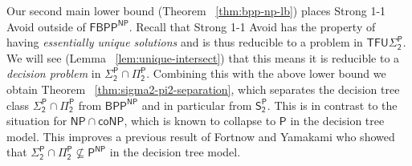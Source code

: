 Our second main lower bound (Theorem ~\ref{thm:bpp-np-lb}) places {\sc Strong 1-1 Avoid} outside of $\mathsf{FBPP^{NP}}$. 
Recall that {\sc Strong 1-1 Avoid} has the property of having \emph{essentially unique solutions} and is thus reducible to a problem in $\mathsf{TFU\Sigma_2^P}$. We will see (Lemma ~\ref{lem:unique-intersect}) that this means it is reducible to a \emph{decision problem} in $\mathsf{\Sigma_2^P \cap \Pi_2^P}$. Combining this with the above lower bound we obtain Theorem ~\ref{thm:sigma2-pi2-separation}, which separates the decision tree class 
$\mathsf{\Sigma_2^P \cap \Pi_2^P}$ from $\mathsf{BPP^{NP}}$ and in particular from $\mathsf{S_2^P}$.
This is in contrast to the situation for $\mathsf{NP} \cap \mathsf{coNP}$, which is known to collapse to $\mathsf{P}$ in the decision tree model. This improves a previous result of Fortnow and Yamakami \cite{forntnow-yamakami} who showed that $\mathsf{\Sigma_2^P \cap \Pi_2^P} \not\subseteq \mathsf{P^{NP}}$ in the decision tree model.

